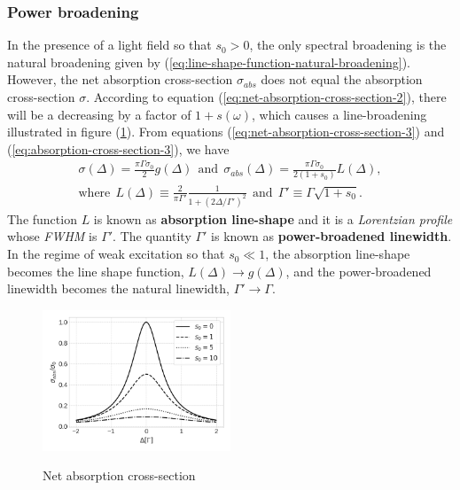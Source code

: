 {%
\subsubsection{Power broadening}
\label{sec:power-broadening}

In the presence of a light field so that $ s_0 > 0 $, the only spectral broadening is the natural broadening given by (\ref{eq:line-shape-function-natural-broadening}). However, the net absorption cross-section $ \sigma_{abs} $ does not equal the absorption cross-section $ \sigma $. According to equation (\ref{eq:net-absorption-cross-section-2}), there will be a decreasing by a factor of $ 1 + s(\omega) $, which causes a line-broadening illustrated in figure (\ref{fig:net-absorption-cross-section}). From equations (\ref{eq:net-absorption-cross-section-3}) and (\ref{eq:absorption-cross-section-3}), we have
\begin{gather}
	\sigma(\Delta) = \frac{\pi \Gamma \sigma_0}{2} g(\Delta)\ \ \textrm{and}\ \ \sigma_{abs}(\Delta) = \frac{\pi \Gamma \sigma_0}{2(1 + s_0)} L(\Delta), 
	\\
	\textrm{where}\ \ L(\Delta) \equiv \frac{2}{\pi \Gamma'} \frac{1}{1 + (2\Delta / \Gamma')^2}\ \ \textrm{and}\ \ \Gamma' \equiv \Gamma \sqrt{1 + s_0}.
	\label{eq:absorption-line-shape}
\end{gather}
The function $ L $ is known as \textbf{absorption line-shape} and it is a \textit{Lorentzian profile} whose \textit{FWHM} is $ \Gamma' $. The quantity $ \Gamma' $ is known as \textbf{power-broadened linewidth}. In the regime of weak excitation so that $ s_0 \ll 1 $, the absorption line-shape becomes the line shape function, $ L(\Delta) \rightarrow g(\Delta) $, and the power-broadened linewidth becomes the natural linewidth, $ \Gamma' \rightarrow \Gamma $.

\begin{figure}[!ht]
	\centering
	\caption{Net absorption cross-section}
	\vspace{-5pt}
	\includegraphics[width=0.5\textwidth]{USPSC-img/net_absorption_cross_section.png}
	\vspace{-5pt}
	\label{fig:net-absorption-cross-section}
\end{figure}

}
